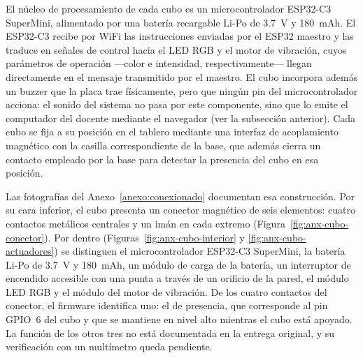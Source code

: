 \documentclass{book}
\begin{document}
El núcleo de procesamiento de cada cubo es un microcontrolador
ESP32-C3 SuperMini, alimentado por una batería recargable Li-Po de
3.7~V y 180~mAh. El ESP32-C3 recibe por WiFi las instrucciones
enviadas por el ESP32 maestro y las traduce en señales de control
hacia el LED RGB y el motor de vibración, cuyos parámetros de
operación —color e intensidad, respectivamente— llegan directamente en
el mensaje transmitido por el maestro. El cubo incorpora además un
buzzer que la placa trae físicamente, pero que ningún pin del
microcontrolador acciona: el sonido del sistema no pasa por este
componente, sino que lo emite el computador del docente mediante el
navegador (ver la subsección anterior). Cada cubo
se fija a su posición en el tablero mediante una interfaz de
acoplamiento magnético con la casilla correspondiente de la base, que
además cierra un contacto empleado por la base para detectar la
presencia del cubo en esa posición.

Las fotografías del Anexo~\ref{anexo:conexionado} documentan esa construcción. Por su cara inferior, el cubo presenta un conector magnético de seis elementos: cuatro contactos metálicos centrales y un imán en cada extremo (Figura~\ref{fig:anx-cubo-conector}). Por dentro (Figuras~\ref{fig:anx-cubo-interior} y \ref{fig:anx-cubo-actuadores}) se distinguen el microcontrolador ESP32-C3 SuperMini, la batería Li-Po de 3.7~V y 180~mAh, un módulo de carga de la batería, un interruptor de encendido accesible con una punta a través de un orificio de la pared, el módulo LED RGB y el módulo del motor de vibración. De los cuatro contactos del conector, el firmware identifica uno: el de presencia, que corresponde al pin GPIO~6 del cubo y que se mantiene en nivel alto mientras el cubo está apoyado. La función de los otros tres no está documentada en la entrega original, y su verificación con un multímetro queda pendiente.
\end{document}
